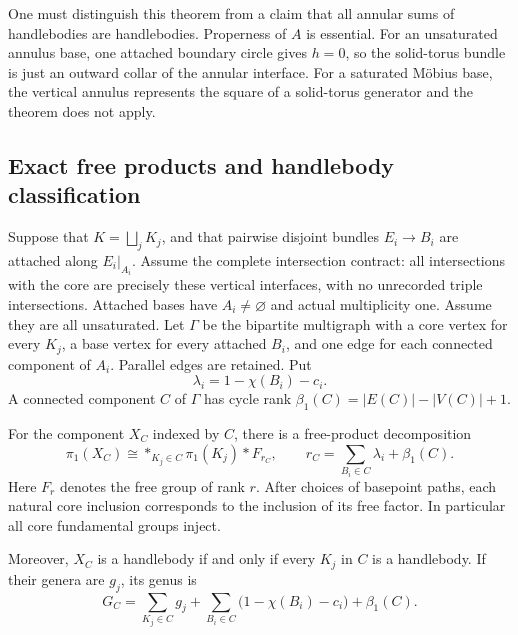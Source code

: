 One must distinguish this theorem from a claim that all annular sums of
handlebodies are handlebodies.  Properness of $A$ is essential.  For an
unsaturated annulus base, one attached boundary circle gives $h=0$, so the
solid-torus bundle is just an outward collar of the annular interface.
For a saturated M\"obius base, the vertical annulus represents the square
of a solid-torus generator and the theorem does not apply.

\subsection{Exact free products and handlebody classification}

Suppose that $K=\bigsqcup_jK_j$, and that pairwise disjoint bundles
$E_i\to B_i$ are attached along $E_i|_{A_i}$.  Assume the complete
intersection contract: all intersections with the core are precisely
these vertical interfaces, with no unrecorded triple intersections.
Attached bases have $A_i\ne\varnothing$ and actual multiplicity one.
Assume they are all unsaturated.  Let $\Gamma$ be the bipartite multigraph
with a core vertex for every $K_j$, a base vertex for every attached $B_i$,
and one edge for each connected component of $A_i$.  Parallel edges are
retained.  Put
\[
 \lambda_i=1-\chi(B_i)-c_i.
\]
A connected component $C$ of $\Gamma$ has cycle rank
$\beta_1(C)=|E(C)|-|V(C)|+1$.

\begin{theorem}\label{thm:free-condense}
For the component $X_C$ indexed by $C$, there is a free-product decomposition
\[
 \pi_1(X_C)\cong
 \mathop{*}_{K_j\in C}\pi_1(K_j)
 *F_{r_C},\qquad
 r_C=\sum_{B_i\in C}\lambda_i+\beta_1(C).
\]
Here $F_r$ denotes the free group of rank $r$.  After choices of basepoint
paths, each natural core inclusion corresponds to the inclusion of its
free factor.  In particular all core fundamental groups inject.

Moreover, $X_C$ is a handlebody if and only if every $K_j$ in $C$ is a
handlebody.  If their genera are $g_j$, its genus is
\begin{equation}\label{eq:unsaturated-genus}
 G_C=\sum_{K_j\in C}g_j+
     \sum_{B_i\in C}\bigl(1-\chi(B_i)-c_i\bigr)+\beta_1(C).
\end{equation}
\end{theorem}


